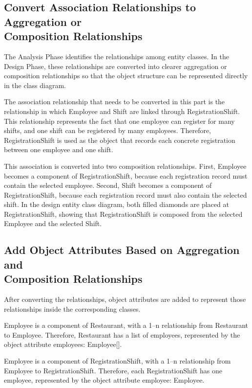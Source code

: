 \subsection{Convert Association Relationships to Aggregation or \\ Composition Relationships}


The Analysis Phase identifies the relationships among entity classes. In the Design Phase, these relationships are converted into clearer aggregation or composition relationships so that the object structure can be represented directly in the class diagram.

The association relationship that needs to be converted in this part is the relationship in which Employee and Shift are linked through RegistrationShift. This relationship represents the fact that one employee can register for many shifts, and one shift can be registered by many employees. Therefore, RegistrationShift is used as the object that records each concrete registration between one employee and one shift.

This association is converted into two composition relationships. First, Employee becomes a component of RegistrationShift, because each registration record must contain the selected employee. Second, Shift becomes a component of RegistrationShift, because each registration record must also contain the selected shift. In the design entity class diagram, both filled diamonds are placed at RegistrationShift, showing that RegistrationShift is composed from the selected Employee and the selected Shift.


\subsection{Add Object Attributes Based on Aggregation and \\ Composition Relationships}

After converting the relationships, object attributes are added to represent those relationships inside the corresponding classes.

Employee is a component of Restaurant, with a 1--n relationship from Restaurant to Employee. Therefore, Restaurant has a list of employees, represented by the object attribute employees: Employee[].

Employee is a component of RegistrationShift, with a 1--n relationship from Employee to RegistrationShift. Therefore, each RegistrationShift has one employee, represented by the object attribute employee: Employee.

